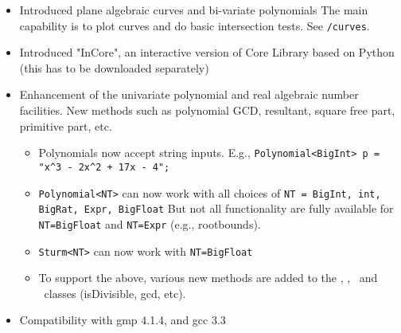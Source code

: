 \documentclass[12pt]{article}
\begin{document}
   \begin{itemize}
   \item Introduced plane algebraic curves and bi-variate polynomials 
         The main capability is to plot curves and do basic
         intersection tests.  See \examplesdir\texttt{/curves}.
   \item Introduced "InCore", an interactive version of Core Library 
   	based on Python (this has to be downloaded separately)
   \item Enhancement of the univariate polynomial and real algebraic
        number facilities. New methods such as
	polynomial GCD, resultant, square free part, primitive part, etc.
	\begin{itemize}
	\item Polynomials now accept string inputs. 
	 E.g., \texttt{Polynomial<BigInt> p = "x\^{}3 - 2x\^{}2 + 17x - 4";}
        \item \texttt{Polynomial<NT>} can now work with all choices of
                \texttt{NT = BigInt, int, BigRat, Expr, BigFloat}
          But not all functionality are fully available for
          \texttt{NT=BigFloat} and \texttt{NT=Expr} (e.g., rootbounds).
        \item \texttt{Sturm<NT>} can now work with \texttt{NT=BigFloat}
	\item To support the above, various new methods are added to the
	  \Int, \Rat, \BF\ and \real\ classes (isDivisible, gcd, etc).
	\end{itemize}
   \item Compatibility with gmp 4.1.4, and gcc 3.3


\end{itemize}
\end{document}
